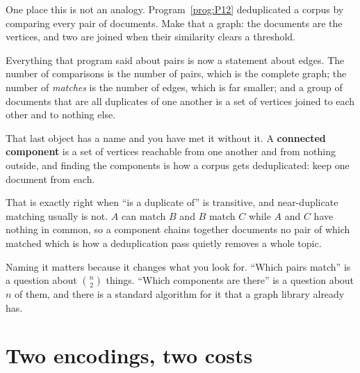 \begin{fr}
One place this is not an analogy. Program~\ref{prog:P12} deduplicated a corpus
by comparing every pair of documents. Make that a graph: the documents are the
vertices, and two are joined when their similarity clears a threshold.

Everything that program said about pairs is now a statement about edges. The
number of comparisons is the number of pairs, which is the complete graph; the
number of \emph{matches} is the number of edges, which is far smaller; and a
group of documents that are all duplicates of one another is a set of vertices
joined to each other and to nothing else.

\begin{aibox}
That last object has a name and you have met it without it. A
\textbf{connected component} is a set of vertices reachable from one another
and from nothing outside, and finding the components is how a corpus gets
deduplicated: keep one document from each.

That is exactly right when \enquote{is a duplicate of} is transitive, and
near-duplicate matching usually is not. $A$ can match $B$ and $B$ match $C$
while $A$ and $C$ have nothing in common, so a component chains together
documents no pair of which matched \dash{} which is how a deduplication pass
quietly removes a whole topic.

Naming it matters because it changes what you look for. \enquote{Which pairs
match} is a question about $\binom{n}{2}$ things. \enquote{Which components
are there} is a question about $n$ of them, and there is a standard algorithm
for it that a graph library already has.
\end{aibox}
\end{fr}

\section{Two encodings, two costs}
\label{sec:P13-encodings}

